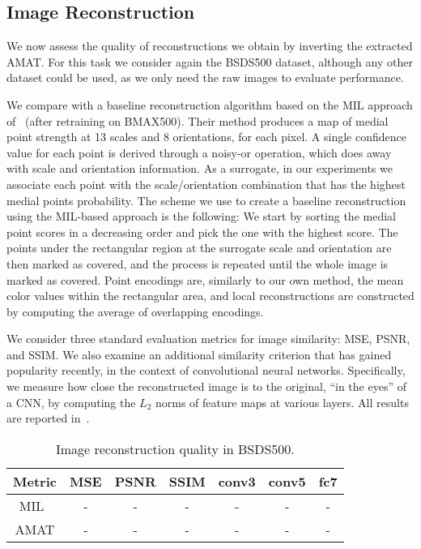 \documentclass[10pt,twocolumn,letterpaper]{article}
\begin{document}
\subsection{Image Reconstruction}\label{sec:experiments:reconstruction}
We now assess the quality of reconstructions we obtain by inverting the extracted AMAT.
For this task we consider again the BSDS500 dataset, although any other dataset could be used, 
as we only need the raw images to evaluate performance.

We compare with a baseline reconstruction algorithm based on the MIL approach 
of~\cite{tsogkas2012learning} (after retraining on BMAX500).
Their method produces a map of medial point strength at 13 scales and 8 orientations, for each pixel.
A single confidence value for each point is derived through a noisy-or operation,
which does away with scale and orientation information.
As a surrogate, in our experiments we associate each point with the scale/orientation combination
that has the highest medial points probability.
The scheme we use to create a baseline reconstruction using the MIL-based approach is the following:
We start by sorting the medial point scores in a decreasing order and pick the one with the highest score.
The points under the rectangular region at the surrogate scale and orientation are then marked as covered,
and the process is repeated until the whole image is marked as covered.
Point encodings are, similarly to our own method, the mean color values within the rectangular area, 
and local reconstructions are constructed by computing the average of overlapping encodings.

We consider three standard evaluation metrics for image similarity: MSE, PSNR, and SSIM.
We also examine an additional similarity criterion that has gained popularity recently, 
in the context of convolutional neural networks.
Specifically, we measure how close the reconstructed image is to the original,
``in the eyes'' of a CNN, by computing the $L_2$ norms of feature maps at various layers. 
All results are reported in~.

\begin{table}
\centering
\begin{tabular}{|c|c|c|c|c|c|c|}
\hline
Metric	&	MSE		&	PSNR	&	SSIM 	&	conv3	&	conv5	&	fc7	\\
\hline
MIL~\cite{tsogkas2012learning}	&	-	& - 	& 	- 	&	-	&	-	&	-	\\
\hline
AMAT	&	-	&	-	&	-	&	-	&	-	&	- 	\\
\hline
\end{tabular}
\caption{Image reconstruction quality in BSDS500.}
\label{tab:reconstruction}
\end{table}
\end{document}
